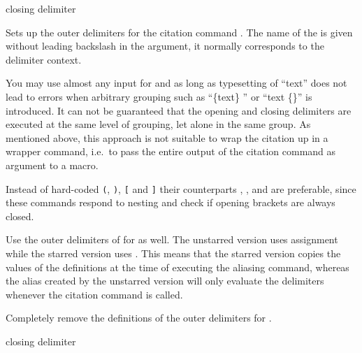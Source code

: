 \documentclass[DIV=9]{scrartcl}
\begin{document}
\begin{ltxsyntax}
        {closing delimiter}

Sets up the outer delimiters for the citation command
. The name of the 
is given without leading backslash in the argument, it normally corresponds to
the delimiter context.

You may use almost any input for  and
 as long as typesetting of
\enquote{text} does not lead to
errors when arbitrary grouping such as
\enquote{\{\allowbreak text\}\allowbreak
{}}
or \enquote{\allowbreak text\allowbreak
\{\}}
is introduced.
It can not be guaranteed that the opening and closing delimiters are executed
at the same level of grouping, let alone in the same group.
As mentioned above, this approach is not suitable to wrap the citation up in a
wrapper command, i.e.\ to pass the entire output of the citation command as
argument to a macro.

Instead of hard-coded \texttt{(}, \texttt{)}, \texttt{[} and \texttt{]} their
 counterparts , ,
 and  are preferable, since these
commands respond to nesting and check if opening brackets are always closed.


Use the outer delimiters of  for
 as well.
The unstarred version uses  assignment while the starred version uses
. This means that the starred version copies the values of the
definitions at the time of executing the aliasing command,
whereas the alias created by the unstarred version will only evaluate the
delimiters whenever the citation command is called.


Completely remove the definitions of the outer delimiters for
.

        {closing delimiter}


\end{ltxsyntax}
\end{document}
